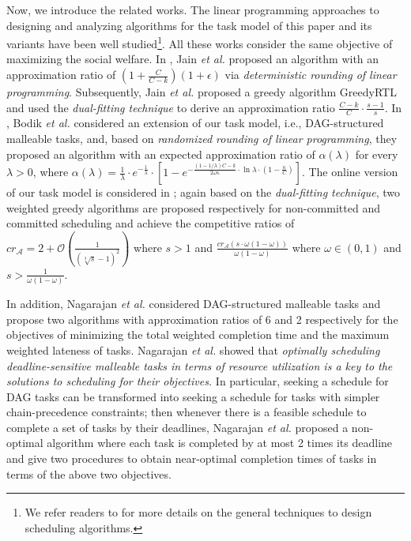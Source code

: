 \documentclass[10pt,journal,compsoc]{IEEEtran}
\begin{document}
Now, we introduce the related works.
The linear programming approaches to designing and analyzing algorithms for the task model of this paper \cite{Jain11a,Jain} and its variants \cite{Lucier,Bodik,Azar} have been well studied\footnote{We refer readers to \cite{Karger,Williamson} for more details on the general techniques to design scheduling algorithms.}. All these works consider the same objective of maximizing the social welfare. In \cite{Jain11a}, Jain {\em et al.} proposed an algorithm with an approximation ratio of $(1+\frac{C}{C-k})(1+\epsilon)$ via {\em deterministic rounding of linear programming}. Subsequently, Jain {\em et al.} \cite{Jain} proposed a greedy algorithm GreedyRTL and used the {\em dual-fitting technique} to derive an approximation ratio $\frac{C-k}{C}\cdot\frac{s-1}{s}$.
In \cite{Bodik}, Bodik {\em et al.} considered an extension of our task model, i.e., DAG-structured malleable tasks, and, based on {\em randomized rounding of linear programming}, they proposed an algorithm with an expected approximation ratio of $\alpha(\lambda)$ for every $\lambda > 0$, where $\alpha(\lambda)=\frac{1}{\lambda}\cdot e^{-\frac{1}{\lambda}}\cdot \left[ 1-e^{-\frac{(1-1/\lambda)C-k}{2\omega \kappa}\cdot \ln{\lambda\cdot (1-\frac{\kappa}{C})}} \right]$. The online version of our task model is considered in \cite{Lucier,Azar}; again based on the {\em dual-fitting technique}, two weighted greedy algorithms are proposed respectively for non-committed and committed scheduling and achieve the competitive ratios of $cr_{\mathcal{A}}=2+\mathcal{O}(\frac{1}{(\sqrt[3]{s}-1)^{2}})$ where $s>1$ \cite{Jain} and $\frac{cr_{\mathcal{A}}\left( s\cdot\omega(1-\omega) \right)}{\omega(1-\omega)}$ where $\omega\in(0, 1)$ and $s>\frac{1}{\omega(1-\omega)}$.



In addition, Nagarajan {\em et al.} \cite{Nagarajan} considered DAG-structured malleable tasks and propose two algorithms with approximation ratios of 6 and 2 respectively for the objectives of minimizing the total weighted completion time and the maximum weighted lateness of tasks. Nagarajan {\em et al.} showed that {\em optimally scheduling deadline-sensitive malleable tasks in terms of resource utilization is a key to the solutions to scheduling for their objectives.} In particular, seeking a schedule for DAG tasks can be transformed into seeking a schedule for tasks with simpler chain-precedence constraints; then whenever there is a feasible schedule to complete a set of tasks by their deadlines, Nagarajan {\em et al.} proposed a non-optimal algorithm where each task is completed by at most 2 times its deadline and give two procedures to obtain near-optimal completion times of tasks in terms of the above two objectives.
\end{document}
